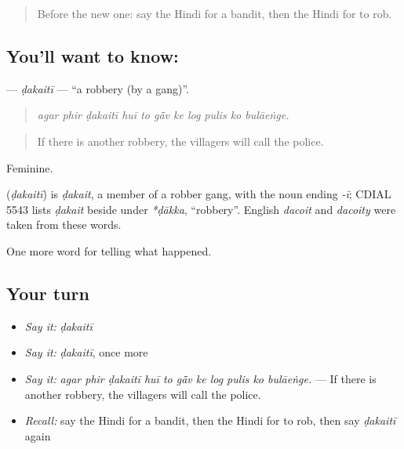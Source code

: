 \label{lesson:HI-C292-dakaiti}



\begin{quote}
Before the new one: say the Hindi for a bandit, then the Hindi for to rob.
\end{quote}

\subsection*{You'll want to know: }
\textbf{} — \emph{ḍakaitī} — \textquotedblleft{}a robbery (by a gang)\textquotedblright{}.

\begin{quote}
          
\end{quote}

\begin{quote}
\emph{agar phir ḍakaitī huī to gā̃v ke log pulis ko bulāeṅge.}
\end{quote}

\begin{quote}
If there is another robbery, the villagers will call the police.
\end{quote}

Feminine.

\begin{cousinweb}
\textbf{} (\emph{ḍakaitī}) is \emph{ḍakait}, a member of a robber gang, with the noun ending \emph{-ī}; CDIAL 5543 lists \emph{ḍakait} beside \textbf{} under \emph{*ḍākka}, \textquotedblleft{}robbery\textquotedblright{}. English \emph{dacoit} and \emph{dacoity} were taken from these words.
\end{cousinweb}

\begin{grammarlens}[title={What you've built}]
One more word for telling what happened.
\end{grammarlens}

\subsection*{Your turn}
\begin{itemize}
\raggedright
  \item \emph{Say it:} \emph{ḍakaitī}
  \item \emph{Say it:} \emph{ḍakaitī}, once more
  \item \emph{Say it:} \emph{agar phir ḍakaitī huī to gā̃v ke log pulis ko bulāeṅge.} — If there is another robbery, the villagers will call the police.
  \item \emph{Recall:} say the Hindi for a bandit, then the Hindi for to rob, then say \emph{ḍakaitī} again
\end{itemize}

